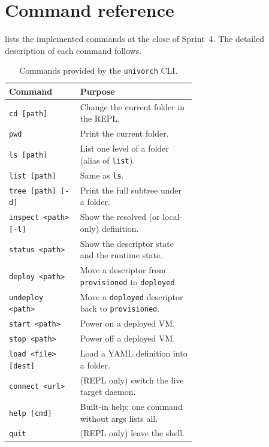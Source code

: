 \section{Command reference}

 lists the implemented commands at the close
of Sprint~4. The detailed description of each command follows.

\begin{table}[ht]
  \centering
  \small
  \begin{tabular}{l p{0.62\linewidth}}
    \toprule
    \textbf{Command} & \textbf{Purpose} \\
    \midrule
    \texttt{cd [path]}        & Change the current folder in the REPL.\\
    \texttt{pwd}              & Print the current folder.\\
    \texttt{ls [path]}        & List one level of a folder (alias of \texttt{list}).\\
    \texttt{list [path]}      & Same as \texttt{ls}.\\
    \texttt{tree [path] [-d]} & Print the full subtree under a folder.\\
    \texttt{inspect <path> [-l]} & Show the resolved (or local-only) definition.\\
    \texttt{status <path>}    & Show the descriptor state and the runtime state.\\
    \texttt{deploy <path>}    & Move a descriptor from \texttt{provisioned} to \texttt{deployed}.\\
    \texttt{undeploy <path>}  & Move a \texttt{deployed} descriptor back to \texttt{provisioned}.\\
    \texttt{start <path>}     & Power on a deployed VM.\\
    \texttt{stop <path>}      & Power off a deployed VM.\\
    \texttt{load <file> [dest]} & Load a YAML definition into a folder.\\
    \texttt{connect <url>}    & (REPL only) switch the live target daemon.\\
    \texttt{help [cmd]}       & Built-in help; one command without args lists all.\\
    \texttt{quit}             & (REPL only) leave the shell.\\
    \bottomrule
  \end{tabular}
  \caption{Commands provided by the \texttt{univorch} CLI.}
  \label{tab:cli-commands}
\end{table}


